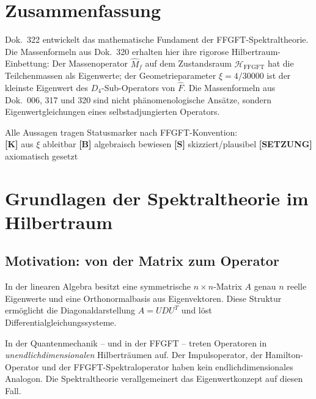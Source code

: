 

\section*{Zusammenfassung}

Dok.~322 entwickelt das mathematische Fundament der FFGFT-Spektraltheorie.
Die Massenformeln aus Dok.~320 erhalten hier ihre rigorose Hilbertraum-Einbettung:
Der Massenoperator $\hat{M}_f$ auf dem
Zustandsraum $\mathcal{H}_{\mathrm{FFGFT}}$ hat die Teilchenmassen als
Eigenwerte; der Geometrieparameter $\xi = 4/30000$ ist der kleinste Eigenwert
des $D_4$-Sub-Operators von $\hat{F}$.
Die Massenformeln aus Dok.~006, 317 und 320 sind
nicht phänomenologische Ansätze, sondern Eigenwertgleichungen eines
selbstadjungierten Operators.

\begin{keyresult}[Statusmarkierung]
Alle Aussagen tragen Statusmarker nach FFGFT-Konvention:\\
\textbf{[K]} aus $\xi$ ableitbar \quad
\textbf{[B]} algebraisch bewiesen \quad
\textbf{[S]} skizziert/plausibel \quad
\textbf{[SETZUNG]} axiomatisch gesetzt
\end{keyresult}

\section{Grundlagen der Spektraltheorie im Hilbertraum}

\subsection{Motivation: von der Matrix zum Operator}

In der linearen Algebra besitzt eine symmetrische $n\times n$-Matrix $A$
genau $n$ reelle Eigenwerte und eine Orthonormalbasis aus Eigenvektoren.
Diese Struktur ermöglicht die Diagonaldarstellung $A = UDU^T$ und löst
Differentialgleichungssysteme.

In der Quantenmechanik -- und in der FFGFT -- treten Operatoren in
\emph{unendlichdimensionalen} Hilberträumen auf. Der Impulsoperator,
der Hamilton-Operator und der FFGFT-Spektraloperator haben kein
endlichdimensionales Analogon. Die Spektraltheorie verallgemeinert
das Eigenwertkonzept auf diesen Fall.

